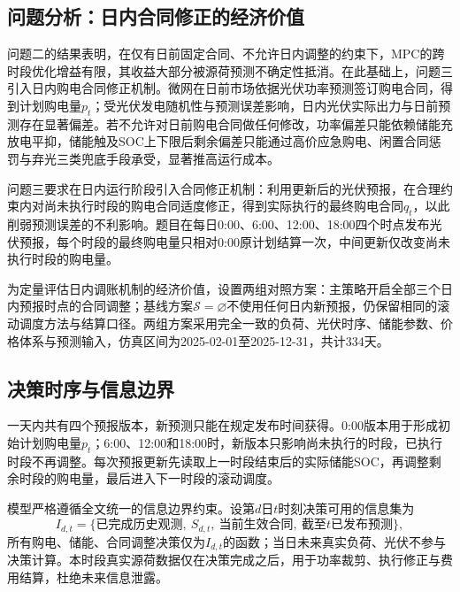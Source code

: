 \subsection{问题分析：日内合同修正的经济价值}
问题二的结果表明，在仅有日前固定合同、不允许日内调整的约束下，MPC的跨时段优化增益有限，其收益大部分被源荷预测不确定性抵消。在此基础上，问题三引入日内购电合同修正机制。微网在日前市场依据光伏功率预测签订购电合同，得到计划购电量$p_t$；受光伏发电随机性与预测误差影响，日内光伏实际出力与日前预测存在显著偏差。若不允许对日前购电合同做任何修改，功率偏差只能依赖储能充放电平抑，储能触及SOC上下限后剩余偏差只能通过高价应急购电、闲置合同惩罚与弃光三类兜底手段承受，显著推高运行成本。

问题三要求在日内运行阶段引入合同修正机制：利用更新后的光伏预报，在合理约束内对尚未执行时段的购电合同适度修正，得到实际执行的最终购电合同$q_t$，以此削弱预测误差的不利影响。题目在每日0:00、6:00、12:00、18:00四个时点发布光伏预报，每个时段的最终购电量只相对0:00原计划结算一次，中间更新仅改变尚未执行时段的购电量。

为定量评估日内调账机制的经济价值，设置两组对照方案：主策略开启全部三个日内预报时点的合同调整；基线方案$\mathcal{S}=\varnothing$不使用任何日内新预报，仍保留相同的滚动调度方法与结算口径。两组方案采用完全一致的负荷、光伏时序、储能参数、价格体系与预测输入，仿真区间为2025-02-01至2025-12-31，共计334天。

\subsection{决策时序与信息边界}
一天内共有四个预报版本，新预测只能在规定发布时间获得。0:00版本用于形成初始计划购电量$p_t$；6:00、12:00和18:00时，新版本只影响尚未执行的时段，已执行时段不再调整。每次预报更新先读取上一时段结束后的实际储能SOC，再调整剩余时段的购电量，最后进入下一时段的滚动调度。

模型严格遵循全文统一的信息边界约束。设第$d$日$t$时刻决策可用的信息集为
\[
I_{d,t}=\{\text{已完成历史观测},\ S_{d,t},\ \text{当前生效合同},\ \text{截至}t\text{已发布预测}\},
\]
所有购电、储能、合同调整决策仅为$I_{d,t}$的函数；当日未来真实负荷、光伏不参与决策计算。本时段真实源荷数据仅在决策完成之后，用于功率裁剪、执行修正与费用结算，杜绝未来信息泄露。

